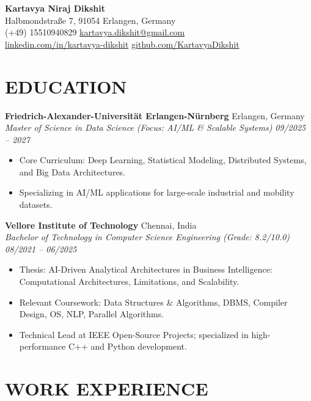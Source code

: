 \documentclass[10pt, a4paper]{article}
\newcommand{\entry}[4]{
  \noindent \textbf{#1} \hfill #2 \\
  \textit{#3} \hfill \textit{#4} \par
  \vspace{2pt}
}
\begin{document}

\begin{center}
    {\Huge \textbf{\color{primarycolor} Kartavya Niraj Dikshit}} \\
    \vspace{6pt}
    \small
    \faMapMarker* Halbmondstraße 7, 91054 Erlangen, Germany \\
    \faPhone* (+49) 15510940829 \quad \faEnvelope* \href{mailto:kartavya.dikshit@gmail.com}{kartavya.dikshit@gmail.com} \\
    \faLinkedin \href{http://www.linkedin.com/in/kartavya-dikshit}{linkedin.com/in/kartavya-dikshit} \quad \faGithub \href{https://github.com/KartavyaDikshit}{github.com/KartavyaDikshit}
\end{center}

\section{EDUCATION}
\entry{Friedrich-Alexander-Universität Erlangen-Nürnberg}{Erlangen, Germany}{Master of Science in Data Science (Focus: AI/ML \& Scalable Systems)}{09/2025 -- 2027}
\begin{itemize}[noitemsep, topsep=0pt]
    \item Core Curriculum: Deep Learning, Statistical Modeling, Distributed Systems, and Big Data Architectures.
    \item Specializing in AI/ML applications for large-scale industrial and mobility datasets.
\end{itemize}

\entry{Vellore Institute of Technology}{Chennai, India}{Bachelor of Technology in Computer Science Engineering (Grade: 8.2/10.0)}{08/2021 -- 06/2025}
\begin{itemize}[noitemsep, topsep=0pt]
    \item Thesis: AI-Driven Analytical Architectures in Business Intelligence: Computational Architectures, Limitations, and Scalability.
    \item Relevant Coursework: Data Structures \& Algorithms, DBMS, Compiler Design, OS, NLP, Parallel Algorithms.
    \item Technical Lead at IEEE Open-Source Projects; specialized in high-performance C++ and Python development.
\end{itemize}

\section{WORK EXPERIENCE}
\end{document}
